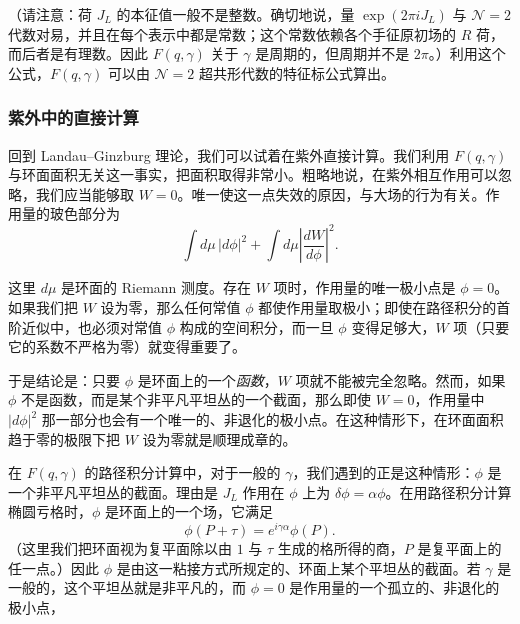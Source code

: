 （请注意：荷 $J_L$ 的本征值一般不是整数。确切地说，量 $\exp(2\pi iJ_L)$ 与 $\mathcal{N}=2$ 代数对易，并且在每个表示中都是常数；这个常数依赖各个手征原初场的 $R$ 荷，而后者是有理数。因此 $F(q,\gamma)$ 关于 $\gamma$ 是周期的，但周期并不是 $2\pi$。）利用这个公式，$F(q,\gamma)$ 可以由 $\mathcal{N}=2$ 超共形代数的特征标公式算出。


\subsubsection{紫外中的直接计算}

回到 Landau--Ginzburg 理论，我们可以试着在紫外直接计算。我们利用 $F(q,\gamma)$ 与环面面积无关这一事实，把面积取得非常小。粗略地说，在紫外相互作用可以忽略，我们应当能够取 $W=0$。唯一使这一点失效的原因，与大场的行为有关。作用量的玻色部分为
\[
  \int d\mu\,|d\phi|^2+\int d\mu\left|\frac{dW}{d\phi}\right|^2 .
\]

这里 $d\mu$ 是环面的 Riemann 测度。存在 $W$ 项时，作用量的唯一极小点是 $\phi=0$。如果我们把 $W$ 设为零，那么任何常值 $\phi$ 都使作用量取极小；即使在路径积分的首阶近似中，也必须对常值 $\phi$ 构成的空间积分，而一旦 $\phi$ 变得足够大，$W$ 项（只要它的系数不严格为零）就变得重要了。

于是结论是：只要 $\phi$ 是环面上的一个\emph{函数}，$W$ 项就不能被完全忽略。然而，如果 $\phi$ 不是函数，而是某个非平凡平坦丛的一个截面，那么即使 $W=0$，作用量中 $|d\phi|^2$ 那一部分也会有一个唯一的、非退化的极小点。在这种情形下，在环面面积趋于零的极限下把 $W$ 设为零就是顺理成章的。

在 $F(q,\gamma)$ 的路径积分计算中，对于一般的 $\gamma$，我们遇到的正是这种情形：$\phi$ 是一个非平凡平坦丛的截面。理由是 $J_L$ 作用在 $\phi$ 上为 $\delta\phi=\alpha\phi$。在用路径积分计算椭圆亏格时，$\phi$ 是环面上的一个场，它满足
\[
  \phi(P+\tau)=e^{i\gamma\alpha}\phi(P).
\]
（这里我们把环面视为复平面除以由 $1$ 与 $\tau$ 生成的格所得的商，$P$ 是复平面上的任一点。）因此 $\phi$ 是由这一粘接方式所规定的、环面上某个平坦丛的截面。若 $\gamma$ 是一般的，这个平坦丛就是非平凡的，而 $\phi=0$ 是作用量的一个孤立的、非退化的极小点，

